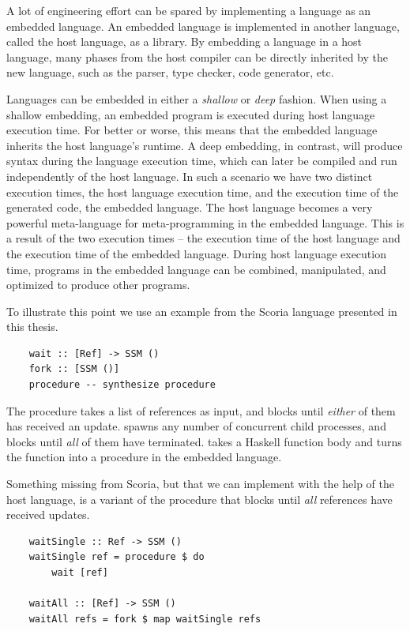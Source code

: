 A lot of engineering effort can be spared by implementing a language as an embedded language. An embedded language is
implemented in another language, called the host language, as a library. By embedding a language in
a host language, many phases from the host compiler can be directly inherited by the new language, such as the parser,
type checker, code generator, etc.

Languages can be embedded in either a \textit{shallow} or \textit{deep} fashion.
When using a shallow embedding, an embedded program is executed during host language execution time. For better or worse,
this means that the embedded language inherits the host language's runtime. A deep embedding, in contrast, will
produce syntax during the language execution time, which can later be compiled and run independently of the host language.
In such a scenario we have two distinct execution times, the host language execution time, and the execution time of the generated
code, the embedded language. The host language becomes a very powerful meta-language for meta-programming in
the embedded language. This is a result of the two execution times -- the execution time of the host language and the
execution time of the embedded language. During host language execution time, programs in the embedded language can be
combined, manipulated, and optimized to produce other programs.

To illustrate this point we use an example from the Scoria language presented in this thesis.

\begin{verbatim}
    wait :: [Ref] -> SSM ()
    fork :: [SSM ()]
    procedure -- synthesize procedure
\end{verbatim}

The  procedure takes a list of references as input, and blocks until \textit{either} of them has received an update.
 spawns any number of concurrent child processes, and blocks until \textit{all} of them have terminated.
 takes a Haskell function body and turns the function into a procedure in the embedded language.

Something missing from Scoria, but that we can implement with the help of the host language, is a variant of the
 procedure that blocks until \textit{all} references have received updates.

\begin{verbatim}
    waitSingle :: Ref -> SSM ()
    waitSingle ref = procedure $ do
        wait [ref]
    
    waitAll :: [Ref] -> SSM ()
    waitAll refs = fork $ map waitSingle refs
\end{verbatim}

